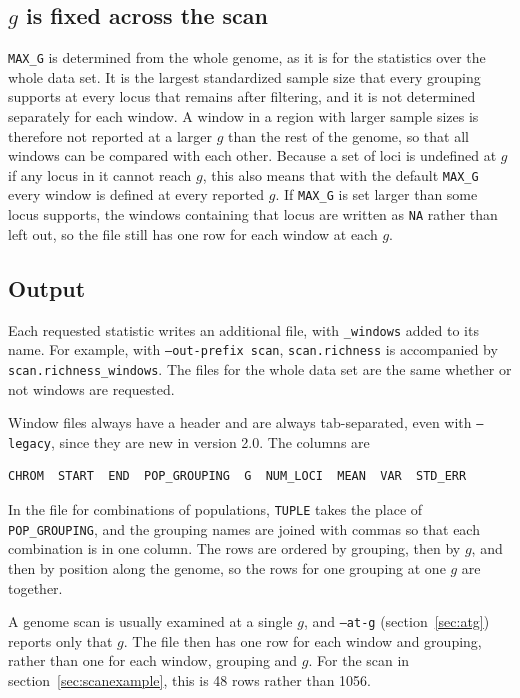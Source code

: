 \documentclass[11pt]{article}
\newcommand{\flag}[1]{\texttt{#1}}
\begin{document}
\subsection{\texorpdfstring{$g$}{g} is fixed across the scan}
\label{sec:wing}

\texttt{MAX\_G} is determined from the whole genome, as it is for the
statistics over the whole data set. It is the largest standardized sample size
that every grouping supports at every locus that remains after filtering, and
it is not determined separately for each window. A window in a region with
larger sample sizes is therefore not reported at a larger $g$ than the rest of
the genome, so that all windows can be compared with each other. Because a set
of loci is undefined at $g$ if any locus in it cannot reach $g$, this also
means that with the default \texttt{MAX\_G} every window is defined at every
reported $g$. If \texttt{MAX\_G} is set larger than some locus supports, the
windows containing that locus are written as \texttt{NA} rather than left out,
so the file still has one row for each window at each $g$.

\subsection{Output}

Each requested statistic writes an additional file, with \texttt{\_windows}
added to its name. For example, with \flag{--out-prefix scan},
\texttt{scan.richness} is accompanied by \texttt{scan.richness\_windows}. The
files for the whole data set are the same whether or not windows are
requested.

Window files always have a header and are always tab-separated, even with
\flag{--legacy}, since they are new in version 2.0. The columns are

\begin{Verbatim}[frame=single,fontsize=\small]
CHROM  START  END  POP_GROUPING  G  NUM_LOCI  MEAN  VAR  STD_ERR
\end{Verbatim}

\noindent In the file for combinations of populations, \texttt{TUPLE} takes
the place of \texttt{POP\_GROUPING}, and the grouping names are joined with
commas so that each combination is in one column. The rows are ordered by
grouping, then by $g$, and then by position along the genome, so the rows for
one grouping at one $g$ are together.

A genome scan is usually examined at a single $g$, and \flag{--at-g}
(section~\ref{sec:atg}) reports only that $g$. The file then has one row for
each window and grouping, rather than one for each window, grouping and $g$.
For the scan in section~\ref{sec:scanexample}, this is 48 rows rather than 1056.
\end{document}
